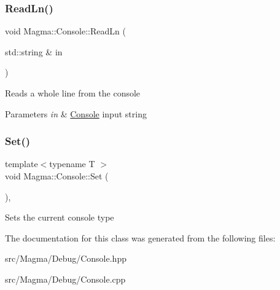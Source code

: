 \subsubsection{\texorpdfstring{Read\+Ln()}{ReadLn()}}
{\footnotesize\ttfamily void Magma\+::\+Console\+::\+Read\+Ln (\begin{DoxyParamCaption}\item[{std\+::string \&}]{in }\end{DoxyParamCaption})\hspace{0.3cm}{\ttfamily [static]}}



Reads a whole line from the console 


\begin{DoxyParams}{Parameters}
{\em in} & \hyperlink{class_magma_1_1_console}{Console} input string\\
\hline
\end{DoxyParams}
\mbox{\label{class_magma_1_1_console_a378572ada79137830c60c52371fcc24e}} 
\subsubsection{\texorpdfstring{Set()}{Set()}}
{\footnotesize\ttfamily template$<$typename T $>$ \\
void Magma\+::\+Console\+::\+Set (\begin{DoxyParamCaption}{ }\end{DoxyParamCaption})\hspace{0.3cm}{\ttfamily [inline]}, {\ttfamily [static]}}



Sets the current console type 



The documentation for this class was generated from the following files\+:\begin{DoxyCompactItemize}
\item 
src/\+Magma/\+Debug/Console.\+hpp\item 
src/\+Magma/\+Debug/Console.\+cpp\end{DoxyCompactItemize}
